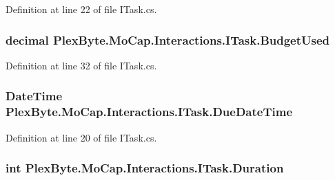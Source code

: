 Definition at line 22 of file I\+Task.\+cs.

\subsubsection[{\texorpdfstring{Budget\+Used}{BudgetUsed}}]{\setlength{\rightskip}{0pt plus 5cm}decimal Plex\+Byte.\+Mo\+Cap.\+Interactions.\+I\+Task.\+Budget\+Used\hspace{0.3cm}{\ttfamily [get]}}\hypertarget{interface_plex_byte_1_1_mo_cap_1_1_interactions_1_1_i_task_a39128d958f8f9c4dcba4a6c3e48d782d}{}\label{interface_plex_byte_1_1_mo_cap_1_1_interactions_1_1_i_task_a39128d958f8f9c4dcba4a6c3e48d782d}


Definition at line 32 of file I\+Task.\+cs.

\subsubsection[{\texorpdfstring{Due\+Date\+Time}{DueDateTime}}]{\setlength{\rightskip}{0pt plus 5cm}Date\+Time Plex\+Byte.\+Mo\+Cap.\+Interactions.\+I\+Task.\+Due\+Date\+Time\hspace{0.3cm}{\ttfamily [get]}}\hypertarget{interface_plex_byte_1_1_mo_cap_1_1_interactions_1_1_i_task_a514288c26d32ef108bfddc81ef45bb1f}{}\label{interface_plex_byte_1_1_mo_cap_1_1_interactions_1_1_i_task_a514288c26d32ef108bfddc81ef45bb1f}


Definition at line 20 of file I\+Task.\+cs.

\subsubsection[{\texorpdfstring{Duration}{Duration}}]{\setlength{\rightskip}{0pt plus 5cm}int Plex\+Byte.\+Mo\+Cap.\+Interactions.\+I\+Task.\+Duration\hspace{0.3cm}{\ttfamily [get]}}\hypertarget{interface_plex_byte_1_1_mo_cap_1_1_interactions_1_1_i_task_a8f8d9d6893e519866c5e7f0577bc9599}{}\label{interface_plex_byte_1_1_mo_cap_1_1_interactions_1_1_i_task_a8f8d9d6893e519866c5e7f0577bc9599}



